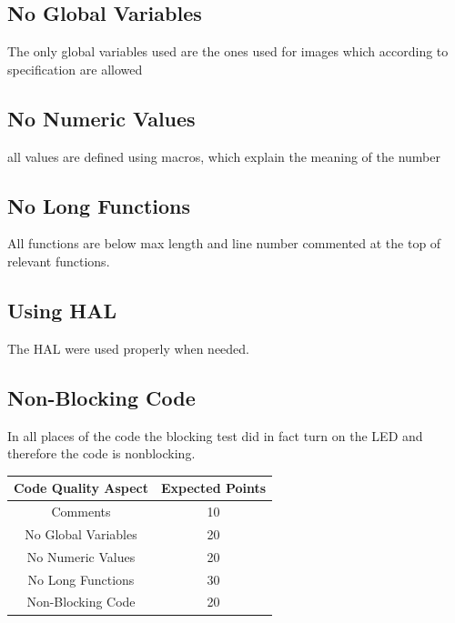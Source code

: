\documentclass{article}
\begin{document}
\subsection{No Global Variables}
\begin{center}
    The only global variables used are the ones used for images which according to specification are allowed
\end{center}
\subsection{No Numeric Values}
\begin{center}
    all values are defined using macros, which explain the meaning of the number
\end{center}
\subsection{No Long Functions}
\begin{center}
    All functions are below max length and line number commented at the top of relevant functions.
\end{center}
\subsection{Using HAL} 
\begin{center}
    The HAL were used properly when needed.
\end{center}
\subsection{Non-Blocking Code}
\begin{center}
    In all places of the code the blocking test did in fact turn on the LED and therefore the code is nonblocking.
\end{center}
\begin{center}
    \begin{tabular}{c|c}
         Code Quality Aspect &  Expected Points\\
         \hline
         Comments & 10\\
         No Global Variables & 20\\
         No Numeric Values & 20\\
         No Long Functions & 30\\
         Non-Blocking Code & 20\\
    \end{tabular}
\end{center}
\newpage
\end{document}
